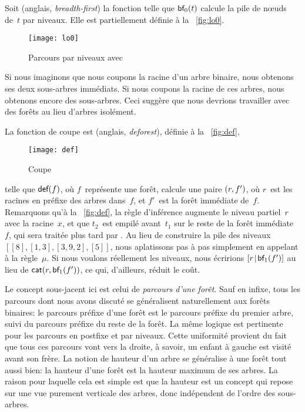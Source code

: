Soit  (anglais,
\emph{breadth-first}) la fonction telle que \(\textsf{bf}_0(t)\)
calcule la pile de n{\oe}uds de~\(t\) par niveaux. Elle est
partiellement définie à la \fig~\vref{fig:lo0}.
\begin{figure}[t]
\centering
\texttt{[image: lo0]}
\caption{Parcours par niveaux avec \label{fig:lo0}}
\end{figure}
Si nous imaginons que nous coupons la racine d'un arbre binaire, nous
obtenons ses deux sous-arbres immédiats. Si nous coupons la racine de
ces arbres, nous obtenons encore des sous-arbres. Ceci suggère que
nous devrions travailler avec des forêts au lieu
d'arbres isolément.

La fonction de coupe est 
(anglais, \emph{deforest}), définie à la \fig~\vref{fig:def},
\begin{figure}
\abovedisplayskip=0pt
\belowdisplayskip=0pt
\centering
\texttt{[image: def]}
\caption{Coupe\label{fig:def}}
\end{figure}
telle que \(\textsf{def}(f)\), où \(f\)~représente une forêt, calcule une
paire \(({r},{f'})\), où \(r\)~est les racines en préfixe des arbres
dans~\(f\), et \(f'\)~est la forêt immédiate de~\(f\). Remarquons qu'à
la \fig~\vref{fig:def}, la règle d'inférence augmente le niveau
partiel~\(r\) avec la racine~\(x\), et que \(t_2\)~est empilé
avant~\(t_1\) sur le reste de la forêt immédiate~\(f\), qui sera
traitée plus tard par . Au
lieu de construire la pile des niveaux \([[8], [1,3], [3,9,2], [5]]\),
nous aplatissons pas à pas simplement en appelant
 à la règle~\(\mu\). Si nous voulons
réellement les niveaux, nous écririons
\([{r}\!\mid\!{\textsf{bf}_1(f')}]\) au lieu de
\(\textsf{cat}(r,\textsf{bf}_1(f'))\), ce qui,
d'ailleurs, réduit le coût.

Le concept sous-jacent ici est celui de \emph{parcours d'une
  forêt}. Sauf en infixe, tous les parcours dont nous avons discuté se
généralisent naturellement aux forêts binaires: le parcours préfixe
d'une forêt est le parcours préfixe du premier arbre, suivi du
parcours préfixe du reste de la forêt. La même logique est pertinente
pour les parcours en postfixe et par niveaux. Cette uniformité
provient du fait que tous ces parcours vont vers la droite, à savoir,
un enfant à gauche est visité avant son frère. La notion de
hauteur d'un arbre se généralise à une forêt tout
aussi bien: la hauteur d'une forêt est la hauteur maximum de ses
arbres. La raison pour laquelle cela est simple est que la hauteur est
un concept qui repose sur une vue purement verticale des arbres, donc
indépendent de l'ordre des sous-arbres.

